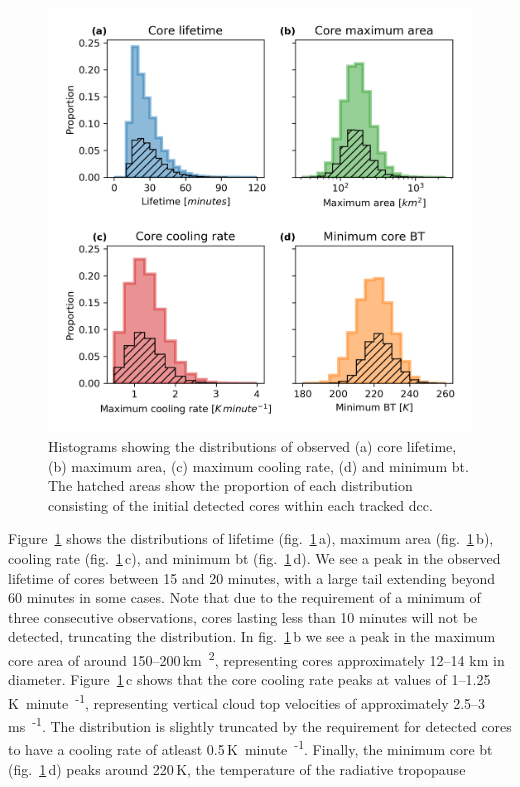 \begin{figure}[tp]
    \centering
    \includegraphics[width=\textwidth]{figures/chapter2_08.png}
    \caption[
    Histograms showing the distributions of observed core lifetimes, maximum areas, cooling rates and \acrshort{bt}
    ]{
    Histograms showing the distributions of observed (a) core lifetime, (b) maximum area, (c) maximum cooling rate, (d) and minimum \acrshort{bt}. The hatched areas show the proportion of each distribution consisting of the initial detected cores within each tracked \acrshort{dcc}.
    }
    \label{fig:core_properties}
\end{figure}

Figure~\ref{fig:core_properties} shows the distributions of lifetime (fig.~\ref{fig:core_properties}\,a), maximum area (fig.~\ref{fig:core_properties}\,b), cooling rate (fig.~\ref{fig:core_properties}\,c), and minimum \acrshort{bt} (fig.~\ref{fig:core_properties}\,d).
We see a peak in the observed lifetime of cores between 15 and 20 minutes, with a large tail extending beyond 60 minutes in some cases.
Note that due to the requirement of a minimum of three consecutive observations, cores lasting less than 10 minutes will not be detected, truncating the distribution.
In fig.~\ref{fig:core_properties}\,b we see a peak in the maximum core area of around 150--200\,\unit{km\textsuperscript{2}}, representing cores approximately 12--14 km in diameter.
Figure~\ref{fig:core_properties}\,c shows that the core cooling rate peaks at values of 1--1.25\,\unit{K minute\textsuperscript{-1}}, representing vertical cloud top velocities of approximately 2.5--3\,\unit{ms\textsuperscript{-1}}.
The distribution is slightly truncated by the requirement for detected cores to have a cooling rate of atleast 0.5\,\unit{K minute\textsuperscript{-1}}.
Finally, the minimum core \acrshort{bt} (fig.~\ref{fig:core_properties}\,d) peaks around 220\,\unit{K}, the temperature of the radiative tropopause \citep{jeevanjee_simple_2020}

